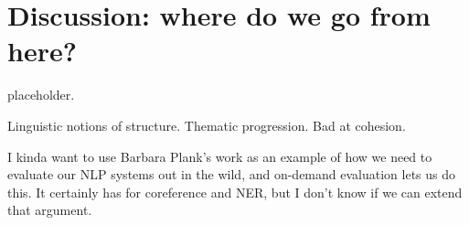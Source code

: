 \chapter[Discussion]{\label{chap:discussion} Discussion: where do we go from here?}
placeholder.


Linguistic notions of structure.
Thematic progression.
Bad at cohesion.

I kinda want to use Barbara Plank's \citep{plank16nonstandard} work as an example of how we need to evaluate our NLP systems out in the wild, and on-demand evaluation lets us do this. It certainly has for coreference and NER, but I don't know if we can extend that argument.
